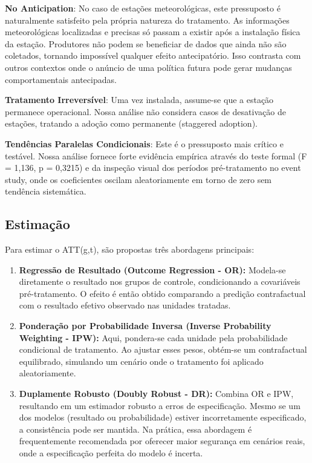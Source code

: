 \documentclass[
	12pt,				%
	oneside,			%
	a4paper,			%
	english,			%
	french,				%
	spanish,			%
	brazil				%
	]{abntex2}
\begin{document}
\textbf{No Anticipation}: No caso de estações meteorológicas, este pressuposto é naturalmente satisfeito pela própria natureza do tratamento. As informações meteorológicas localizadas e precisas só passam a existir após a instalação física da estação. Produtores não podem se beneficiar de dados que ainda não são coletados, tornando impossível qualquer efeito antecipatório. Isso contrasta com outros contextos onde o anúncio de uma política futura pode gerar mudanças comportamentais antecipadas.

\textbf{Tratamento Irreversível}: Uma vez instalada, assume-se que a estação permanece operacional. Nossa análise não considera casos de desativação de estações, tratando a adoção como permanente (staggered adoption).

\textbf{Tendências Paralelas Condicionais}: Este é o pressuposto mais crítico e testável. Nossa análise fornece forte evidência empírica através do teste formal (F = 1,136, p = 0,3215) e da inspeção visual dos períodos pré-tratamento no event study, onde os coeficientes oscilam aleatoriamente em torno de zero sem tendência sistemática.

\subsection{Estimação}

Para estimar o ATT(g,t), são propostas três abordagens principais:

\begin{enumerate}
\item \textbf{Regressão de Resultado (Outcome Regression - OR):} Modela-se diretamente o resultado nos grupos de controle, condicionando a covariáveis pré-tratamento. O efeito é então obtido comparando a predição contrafactual com o resultado efetivo observado nas unidades tratadas.

\item \textbf{Ponderação por Probabilidade Inversa (Inverse Probability Weighting - IPW):} Aqui, pondera-se cada unidade pela probabilidade condicional de tratamento. Ao ajustar esses pesos, obtém-se um contrafactual equilibrado, simulando um cenário onde o tratamento foi aplicado aleatoriamente.

\item \textbf{Duplamente Robusto (Doubly Robust - DR):} Combina OR e IPW, resultando em um estimador robusto a erros de especificação. Mesmo se um dos modelos (resultado ou probabilidade) estiver incorretamente especificado, a consistência pode ser mantida. Na prática, essa abordagem é frequentemente recomendada por oferecer maior segurança em cenários reais, onde a especificação perfeita do modelo é incerta.
\end{enumerate}
\end{document}
